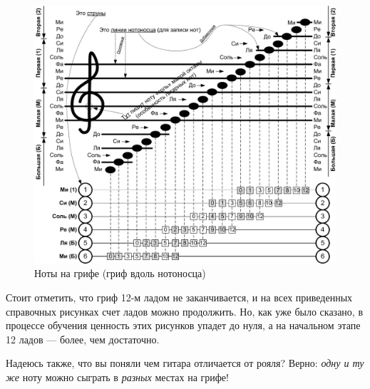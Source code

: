 \begin{figure}[!ht]
    \centering
    \includegraphics[width=\textwidth]{fig/lad-by-griph} 
    \caption{Ноты на грифе (гриф вдоль нотоносца)}\label{fig:guitar:lad-by-griph}
\end{figure} 

Стоит отметить, что гриф 12-м ладом не заканчивается, и на всех приведенных справочных рисунках счет ладов можно продолжить. Но, как уже было сказано, в процессе обучения ценность этих рисунков упадет до нуля, а на начальном этапе 12 ладов --- более, чем достаточно.

Надеюсь также, что вы поняли чем гитара отличается от рояля? Верно: \emph{одну и ту же} ноту можно сыграть в \emph{разных} местах на грифе!


